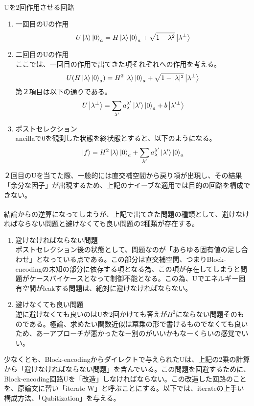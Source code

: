 \documentclass[a4paper,10.5pt]{article}
\numberwithin{equation}{section}
\begin{document}
\begin{setupbox}{Uを2回作用させる回路}
    \begin{enumerate}
        \item 一回目のUの作用\\
        \begin{align*}
            U\ket{\lambda}\ket{0}_{a}=H\ket{\lambda}\ket{0}_{a}+\sqrt{1-\lambda^{2}}\ket{\lambda^{\perp}}
        \end{align*}
        \item 二回目のUの作用\\
        ここでは、一回目の作用で出てきた項それぞれへの作用を考える。
        \begin{align*}
           U (H\ket{\lambda}\ket{0}_{a})=H^{2}\ket{\lambda}\ket{0}_{a}+\sqrt{1-|\lambda|^{2}}\ket{\lambda^{\perp}}
        \end{align*}
        第２項目は以下の通りである。
        \begin{align*}
            U\ket{\lambda^{\perp}}=\sum_{\lambda'}a_{\lambda}^{\lambda'}\ket{\lambda'}\ket{0}_{a}+b\ket{\lambda'^{\perp}}
        \end{align*}
        \item ポストセレクション\\
        ancillaで0を観測した状態を終状態とすると、以下のようになる。
        \begin{align*}
            \ket{f}=H^{2}\ket{\lambda}\ket{0}_{a}+\sum_{\lambda'}a_{\lambda}^{\lambda'}\ket{\lambda'}\ket{0}_{a}
        \end{align*}
    \end{enumerate}
\end{setupbox}
２回目のUを当てた際、一般的には直交補空間から戻り項が出現し、その結果「余分な因子」が出現するため、上記のナイーブな適用では目的の回路を構成できない。\\
\\
結論からの逆算になってしまうが、上記で出てきた問題の種類として、避けなければならない問題と避けなくても良い問題の2種類が存在する。
\begin{enumerate}
    \item 避けなければならない問題\\
    ポストセレクション後の状態として、問題なのが「あらゆる固有値の足し合わせ」となっている点である。この部分は直交補空間、つまりBlock-encodingの未知の部分に依存する項となる為、この項が存在してしまうと問題がケースバイケースとなって制御不能となる。この為、Uでエネルギー固有空間がleakする問題は、絶対に避けなければならない。
    \item 避けなくても良い問題\\
    逆に避けなくても良いのはUを2回かけても答えが$H^{2}$にならない問題そのものである。極論、求めたい関数近似は冪乗の形で書けるものでなくても良いため、あーアプローチが悪かったなー別のがいいかもなーくらいの感覚でいい。
\end{enumerate}
少なくとも、Block-encodingからダイレクトで与えられたUは、上記の2乗の計算から「避けなければならない問題」を含んでいる。この問題を回避するために、Block-encoding回路Uを「改造」しなければならない。この改造した回路のことを、原論文\cite{Low:2016znh}に習い「iterate W」と呼ぶことにする。以下では、iterateの上手い構成方法、「Qubitization」を与える。
\end{document}
